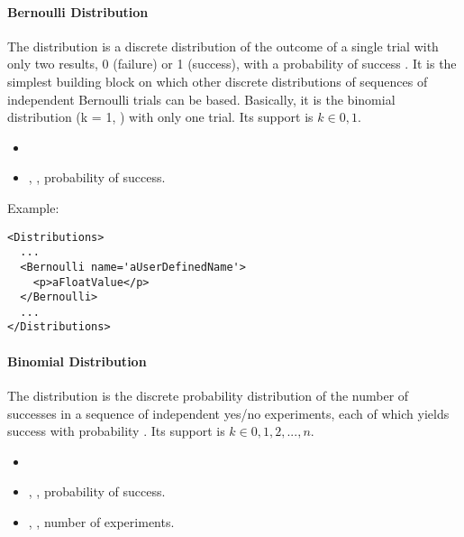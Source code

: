 \paragraph{Bernoulli Distribution}
\label{Bernoulli}
The  distribution is a discrete distribution of the outcome
of a single trial with only two results, 0 (failure) or 1 (success), with a
probability of success .
%
It is the simplest building block on which other discrete distributions of
sequences of independent Bernoulli trials can be based.
%
Basically, it is the binomial distribution (k = 1, ) with only
one trial.
%
Its support is $k \in {0, 1}$.

%
\attrIntro
\vspace{-5mm}
\begin{itemize}
\itemsep0em
\item \nameDescription   
\end{itemize}
\vspace{-5mm}
\subnodeIntro
\begin{itemize}
\item {}, , probability of success.
 \end{itemize}
Example:
\begin{lstlisting}[style=XML]
<Distributions>
  ...
  <Bernoulli name='aUserDefinedName'>
    <p>aFloatValue</p>
  </Bernoulli>
  ...
</Distributions>
\end{lstlisting}

\paragraph{Binomial Distribution}
\label{Binomial}
The  distribution is the discrete probability distribution of
the number of successes in a sequence of  independent yes/no
experiments, each of which yields success with probability .
%
Its support is $k \in {0, 1, 2, ..., n}$.

%
\attrIntro
\vspace{-5mm}
\begin{itemize}
\itemsep0em
\item \nameDescription   
\end{itemize}
\vspace{-5mm}
\subnodesIntro
\begin{itemize}
\item {}, ,  probability of success.
\item {}, , number of experiments.
\end{itemize}

